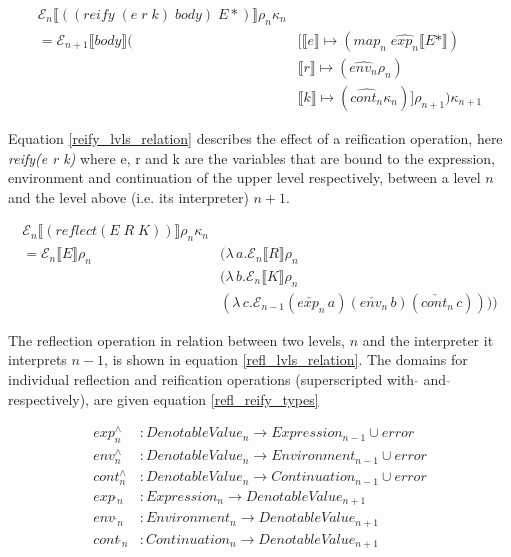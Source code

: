 \documentclass[fleqn]{article}
\theoremstyle{definition}
\begin{document}
\begin{equation}
	\begin{split}
		\mathcal{E}_n \llbracket ((reify\;(e\;r\;k)\;body)\;E*) \rrbracket \rho_n \kappa_n \\
		= \mathcal{E}_{n+1} \llbracket body \rrbracket (& [\llbracket e \rrbracket \mapsto (map_n \; \hat{exp_{n}} \llbracket E* \rrbracket) \\
		& \llbracket r \rrbracket \mapsto (\hat{env_{n}}  \rho_n) \\
		& \llbracket k \rrbracket \mapsto (\hat{cont_{n}} \kappa_n)]\rho_{n+1}) \kappa_{n+1} \label{reify_lvls_relation}
	\end{split}
\end{equation}

Equation \ref{reify_lvls_relation} describes the effect of a reification operation, here \textit{reify(e r k)} where e, r and k are the variables that are bound to the expression, environment and continuation of the upper level respectively, between a level $n$ and the level above (i.e. its interpreter) $n+1$.

\begin{equation}
	\begin{split}
	\mathcal{E}_n \llbracket (reflect (E\;R\;K)) \rrbracket \rho_n \kappa_n \\
	= \mathcal{E}_n \llbracket E \rrbracket \rho_n & (\lambda\,a.\mathcal{E}_n \llbracket R \rrbracket \rho_n \\
										& (\lambda\,b.\mathcal{E}_n \llbracket K \rrbracket \rho_n \\
										& (\lambda\,c.\mathcal{E}_{n-1} (\check{exp_n}\,a)(\check{env_n}\,b)(\check{cont_n}\,c)))) \label{refl_lvls_relation}
	\end{split}									
\end{equation}

The reflection operation in relation between two levels, $n$ and the interpreter it interprets $n-1$, is shown in equation \ref{refl_lvls_relation}. The domains for individual reflection and reification operations (superscripted with $\hat{}$ and $\check{}$ respectively), are given equation \ref{refl_reify_types}

\begin{equation}
	\begin{split}
		exp^\wedge_n & : DenotableValue_n \rightarrow Expression_{n-1} \cup {error}		\\
		env^\wedge_n & : DenotableValue_n \rightarrow Environment_{n-1} \cup {error}	\\
		cont^\wedge_n & : DenotableValue_n \rightarrow Continuation_{n-1} \cup {error} 	\\
		exp\,\check{}_{n} & : Expression_{n} \rightarrow DenotableValue_{n+1}			\\
		env\,\check{}_{n} & : Environment_{n} \rightarrow DenotableValue_{n+1}			\\
		cont\,\check{}_{n} & : Continuation_{n} \rightarrow DenotableValue_{n+1}		\label{refl_reify_types}
	\end{split}
\end{equation}
\end{document}
